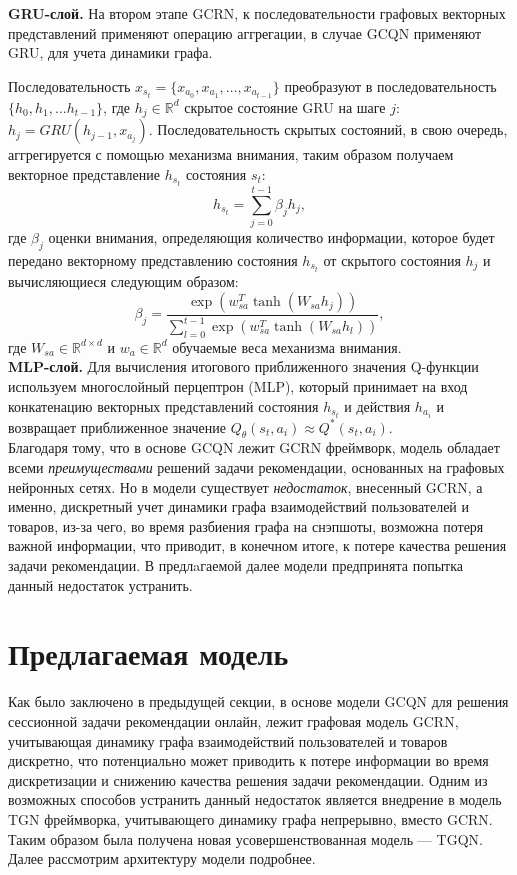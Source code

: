\documentclass[a4paper,14pt,oneside]{mipt-thesis-ms}
\begin{document}
{\bf GRU-слой.} На втором этапе GCRN, к последовательности графовых векторных представлений применяют операцию аггрегации, в случае GCQN применяют GRU, для учета динамики графа.

Последовательность $x_{s_t} = \{x_{a_0}, x_{a_1}, \dots, x_{a_{t-1}}\}$ преобразуют в последовательность $\{h_0, h_1, \dots h_{t-1}\}$, где $h_j \in \mathbb{R}^d$ скрытое состояние GRU на шаге $j$: $h_j = GRU(h_{j-1}, x_{a_j})$.
Последовательность скрытых состояний, в свою очередь, аггрегируется с помощью механизма внимания, таким образом получаем векторное представление $h_{s_t}$ состояния $s_t$:
$$h_{s_t} = \sum_{j=0}^{t-1} \beta_j h_j,$$
где $\beta_j$ оценки внимания, определяющия количество информации, которое будет передано векторному представлению состояния  $h_{s_t}$ от скрытого состояния $h_j$ и вычисляющиеся следующим образом:
$$\beta_j = \frac{\exp(w_{sa}^T\tanh(W_{sa}h_j))}{\sum_{l=0}^{t-1}\exp(w_{sa}^T\tanh(W_{sa}h_l))},$$
где $W_{sa} \in \mathbb{R}^{d \times d}$ и $w_a \in \mathbb{R}^d$ обучаемые веса механизма внимания.\\

{\bf MLP-слой.} Для вычисления итогового приближенного значения Q-функции используем многослойный перцептрон (MLP), который принимает на вход конкатенацию векторных представлений состояния $h_{s_t}$ и действия $h_{a_i}$ и возвращает приближенное значение $Q_{\theta}(s_t, a_i) \approx Q^*(s_t, a_i)$.\\

Благодаря тому, что в основе GCQN лежит GCRN фреймворк, модель обладает всеми {\it преимуществами} решений задачи рекомендации, основанных на графовых нейронных сетях. Но в модели существует {\it недостаток}, внесенный GCRN, а именно, дискретный учет динамики графа взаимодействий пользователей и товаров, из-за чего, во время разбиения графа на снэпшоты, возможна потеря важной информации, что приводит, в конечном итоге, к потере качества решения задачи рекомендации. В предлaгаемой далее модели предпринята попытка данный недостаток устранить.

\section{Предлагаемая модель}

Как было заключено в предыдущей секции, в основе модели GCQN для решения сессионной задачи рекомендации онлайн, лежит графовая модель GCRN, учитывающая динамику графа взаимодействий пользователей и товаров дискретно, что потенциально может приводить к потере информации во время дискретизации и снижению качества решения задачи рекомендации. Одним из возможных способов устранить данный недостаток является внедрение в модель TGN фреймворка, учитывающего динамику графа непрерывно, вместо GCRN. Таким образом была получена новая усовершенствованная модель --- TGQN. Далее рассмотрим архитектуру модели подробнее.
\\
\end{document}
